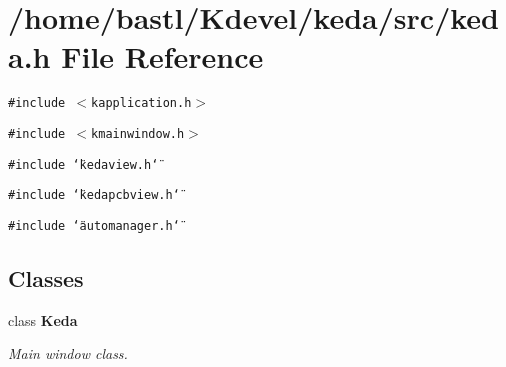 \section{/home/bastl/Kdevel/keda/src/keda.h File Reference}
\label{keda_8h}
{\tt \#include $<$kapplication.h$>$}\par
{\tt \#include $<$kmainwindow.h$>$}\par
{\tt \#include \char`\"{}kedaview.h\char`\"{}}\par
{\tt \#include \char`\"{}kedapcbview.h\char`\"{}}\par
{\tt \#include \char`\"{}automanager.h\char`\"{}}\par
\subsection*{Classes}
\begin{CompactItemize}
\item 
class {\bf Keda}
\begin{CompactList}\small\item\em Main window class. \item\end{CompactList}\end{CompactItemize}
